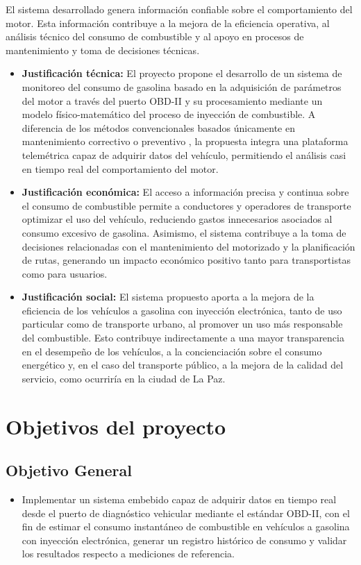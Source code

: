 El sistema desarrollado genera información confiable sobre el comportamiento del motor. Esta información contribuye a la mejora de la eficiencia operativa, al análisis técnico del consumo de combustible y al apoyo en procesos de mantenimiento y toma de decisiones técnicas.
\begin{itemize}
	\item \textbf{Justificación técnica:}
	El proyecto propone el desarrollo de un sistema de monitoreo del consumo de gasolina basado en la adquisición de parámetros del motor a través del puerto OBD-II y su procesamiento mediante un modelo físico-matemático del proceso de inyección de combustible. A diferencia de los métodos convencionales basados únicamente en mantenimiento correctivo o preventivo \citep{Reif2015}, la propuesta integra una plataforma telemétrica capaz de adquirir datos del vehículo, permitiendo el análisis casi en tiempo real del comportamiento del motor.
	
	\item \textbf{Justificación económica:}
	El acceso a información precisa y continua sobre el consumo de combustible permite a conductores y operadores de transporte optimizar el uso del vehículo, reduciendo gastos innecesarios asociados al consumo excesivo de gasolina. Asimismo, el sistema contribuye a la toma de decisiones relacionadas con el mantenimiento del motorizado y la planificación de rutas, generando un impacto económico positivo tanto para transportistas como para usuarios.
	
	\item \textbf{Justificación social:}
	El sistema propuesto aporta a la mejora de la eficiencia de los vehículos a gasolina con inyección electrónica, tanto de uso particular como de transporte urbano, al promover un uso más responsable del combustible. Esto contribuye indirectamente a una mayor transparencia en el desempeño de los vehículos, a la concienciación sobre el consumo energético y, en el caso del transporte público, a la mejora de la calidad del servicio, como ocurriría en la ciudad de La Paz.
\end{itemize}

\section{Objetivos del proyecto}
\subsection{Objetivo General}
\begin{itemize}
	\item Implementar un sistema embebido capaz de adquirir datos en tiempo real desde el puerto de diagnóstico vehicular mediante el estándar OBD-II, con el fin de estimar el consumo instantáneo de combustible en vehículos a gasolina con inyección electrónica, generar un registro histórico de consumo y validar los resultados respecto a mediciones de referencia.
\end{itemize}


